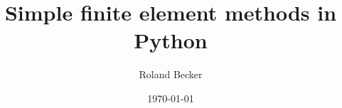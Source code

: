 \documentclass[english,11pt]{article}
\title{Simple finite element methods in {Python}}
\author{Roland Becker}
\date{\today}
\numberwithin{equation}{section}
\begin{document}
%
\maketitle
\tableofcontents
%

%
\begin{appendices}

\end{appendices}












%
%
\end{document}
